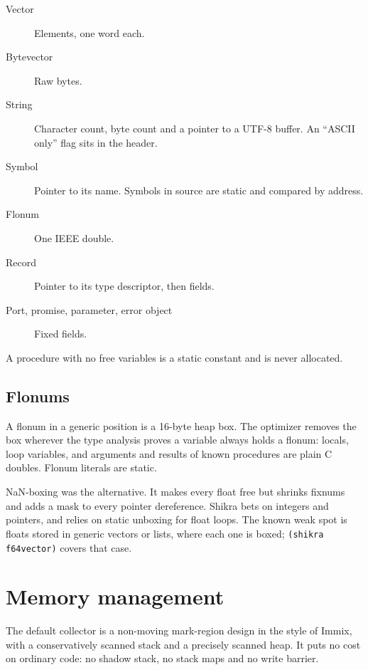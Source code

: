 \documentclass[a4paper,11pt]{article}
\begin{document}
\begin{description}
\item[Vector] Elements, one word each.
\item[Bytevector] Raw bytes.
\item[String] Character count, byte count and a pointer to a UTF-8 buffer.
  An ``ASCII only'' flag sits in the header.
\item[Symbol] Pointer to its name. Symbols in source are static and compared
  by address.
\item[Flonum] One IEEE double.
\item[Record] Pointer to its type descriptor, then fields.
\item[Port, promise, parameter, error object] Fixed fields.
\end{description}

A procedure with no free variables is a static constant and is never
allocated.

\subsection{Flonums}

A flonum in a generic position is a 16-byte heap box. The optimizer removes
the box wherever the type analysis proves a variable always holds a flonum:
locals, loop variables, and arguments and results of known procedures are
plain C doubles. Flonum literals are static.

NaN-boxing was the alternative. It makes every float free but shrinks
fixnums and adds a mask to every pointer dereference. Shikra bets on
integers and pointers, and relies on static unboxing for float loops. The
known weak spot is floats stored in generic vectors or lists, where each one
is boxed; \texttt{(shikra f64vector)} covers that case.

\section{Memory management}

The default collector is a non-moving mark-region design in the style of
Immix, with a conservatively scanned stack and a precisely scanned heap. It
puts no cost on ordinary code: no shadow stack, no stack maps and no write
barrier.
\end{document}
